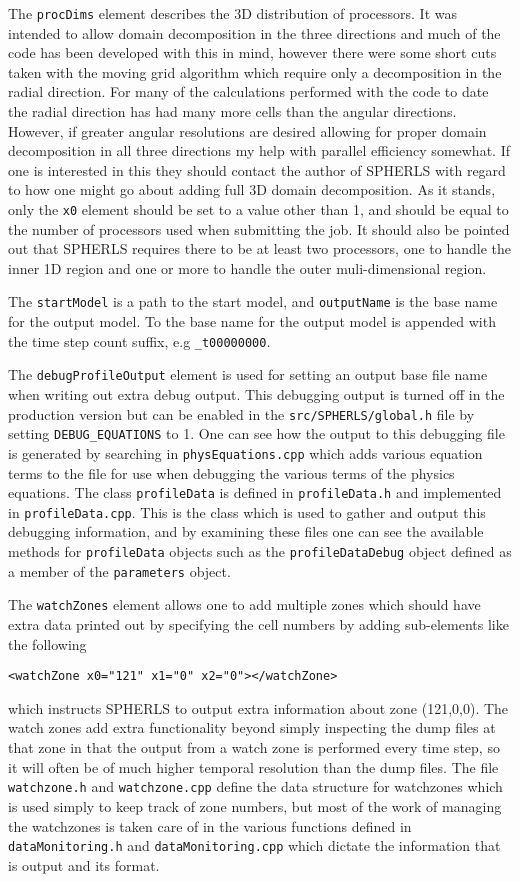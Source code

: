 \documentclass[12pt,a4paper]{book}
\begin{document}
The {\tt procDims} element describes the 3D distribution of processors. It was intended to allow domain decomposition in the three directions and much of the code has been developed with this in mind, however there were some short cuts taken with the moving grid algorithm which require only a decomposition in the radial direction. For many of the calculations performed with the code to date the radial direction has had many more cells than the angular directions. However, if greater angular resolutions are desired allowing for proper domain decomposition in all three directions my help with parallel efficiency somewhat. If one is interested in this they should contact the author of SPHERLS with regard to how one might go about adding full 3D domain decomposition. As it stands, only the {\tt x0} element should be set to a value other than 1, and should be equal to the number of processors used when submitting the job. It should also be pointed out that SPHERLS requires there to be at least two processors, one to handle the inner 1D region and one or more to handle the outer muli-dimensional region.

The {\tt startModel} is a path to the start model, and {\tt outputName} is the base name for the output model. To the base name for the output model is appended with the time step count suffix, e.g {\tt \_t00000000}.

The {\tt debugProfileOutput} element is used for setting an output base file name when writing out extra debug output. This debugging output is turned off in the production version but can be enabled in the {\tt src/SPHERLS/global.h} file by setting {\tt DEBUG\_EQUATIONS} to 1. One can see how the output to this debugging file is generated by searching in {\tt physEquations.cpp} which adds various equation terms to the file for use when debugging the various terms of the physics equations. The class {\tt profileData} is defined in {\tt profileData.h} and implemented in {\tt profileData.cpp}. This is the class which is used to gather and output this debugging information, and by examining these files one can see the available methods for {\tt profileData} objects such as the {\tt profileDataDebug} object defined as a member of the {\tt parameters} object.

The {\tt watchZones} element allows one to add multiple zones which should have extra data printed out by specifying the cell numbers by adding sub-elements like the following
\begin{verbatim}
<watchZone x0="121" x1="0" x2="0"></watchZone>
\end{verbatim}
which instructs SPHERLS to output extra information about zone (121,0,0). The watch zones add extra functionality beyond simply inspecting the dump files at that zone in that the output from a watch zone is performed every time step, so it will often be of much higher temporal resolution than the dump files. The file {\tt watchzone.h} and {\tt watchzone.cpp} define the data structure for watchzones which is used simply to keep track of zone numbers, but most of the work of managing the watchzones is taken care of in the various functions defined in {\tt dataMonitoring.h} and {\tt dataMonitoring.cpp} which dictate the information that is output and its format.
\end{document}
